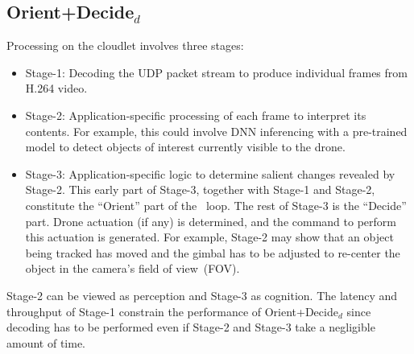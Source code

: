 \subsection{Orient+Decide$_d$}
\label{sec:cloudlet}

Processing on the cloudlet involves three stages:
\begin{itemize}

\item{Stage-1: Decoding the UDP packet stream to produce individual
    frames from H.264 video.}

\item{Stage-2: Application-specific processing of each frame to
    interpret its contents.  For example, this could involve DNN
    inferencing with a pre-trained model to detect objects of
    interest currently visible to the drone.}

\item{Stage-3: Application-specific logic to determine salient changes
    revealed by Stage-2.  This early part of Stage-3, together with
    Stage-1 and Stage-2, constitute the ``Orient'' part of the
    \ooda~loop.  The rest of Stage-3 is the ``Decide'' part. Drone
    actuation (if any) is determined, and the command to perform this
    actuation is generated.  For example, Stage-2 may show that an
    object being tracked has moved and the gimbal has to be adjusted
    to re-center the object in the camera's field of view~(FOV).}
\end{itemize}
Stage-2 can be viewed as perception and Stage-3 as cognition.  The
latency and throughput of Stage-1 constrain the performance of
Orient+Decide$_d$ since decoding has to be performed even if Stage-2
and Stage-3 take a negligible amount of time.


